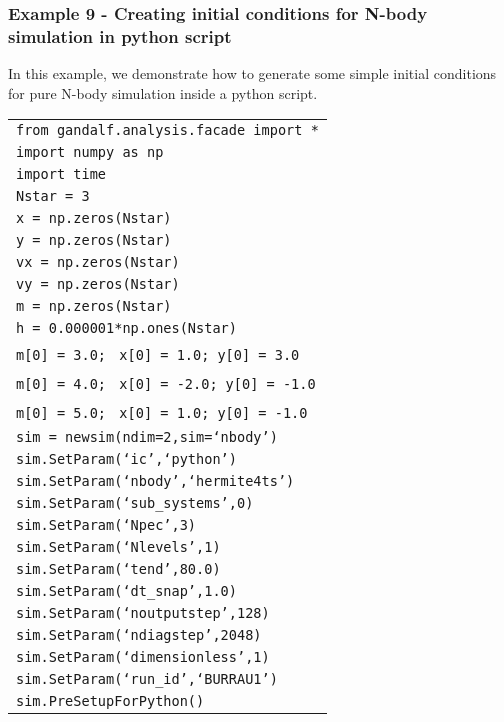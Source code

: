 \documentclass[a4paper]{article}
\newcommand{\var}[1]{\texttt{#1}}
\begin{document}
\subsubsection{Example  9 - Creating initial conditions for N-body simulation in python script}
In this example, we demonstrate how to generate some simple initial conditions for pure N-body simulation inside a python script. \\

\begin{tabular}{p{14.0cm}}
\var{from gandalf.analysis.facade import *} \\
\var{import numpy as np} \\
\var{import time} \\
\var{Nstar = 3} \\
\var{x = np.zeros(Nstar)} \\
\var{y = np.zeros(Nstar)} \\
\var{vx = np.zeros(Nstar)} \\
\var{vy = np.zeros(Nstar)} \\
\var{m = np.zeros(Nstar)} \\
\var{h = 0.000001*np.ones(Nstar)} \\
\var{m[0] = 3.0;}\,\,\, \var{x[0] = 1.0;}\,\,\,\var{y[0] = 3.0} \\
\var{m[0] = 4.0;}\,\,\, \var{x[0] = -2.0;}\,\,\,\var{y[0] = -1.0} \\
\var{m[0] = 5.0;}\,\,\, \var{x[0] = 1.0;}\,\,\,\var{y[0] = -1.0} \\
\var{sim = newsim(ndim=2,sim=`nbody')} \\
\var{sim.SetParam(`ic',`python')} \\
\var{sim.SetParam(`nbody',`hermite4ts')} \\
\var{sim.SetParam(`sub\_systems',0)}  \\
\var{sim.SetParam(`Npec',3)} \\
\var{sim.SetParam(`Nlevels',1)} \\
\var{sim.SetParam(`tend',80.0)} \\
\var{sim.SetParam(`dt\_snap',1.0)} \\
\var{sim.SetParam(`noutputstep',128)} \\
\var{sim.SetParam(`ndiagstep',2048)} \\
\var{sim.SetParam(`dimensionless',1)} \\
\var{sim.SetParam(`run\_id',`BURRAU1')} \\
\var{sim.PreSetupForPython()} \\

\end{tabular}
\end{document}

